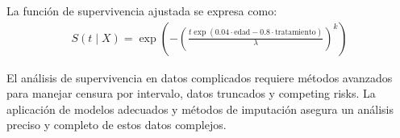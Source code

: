 \documentclass[a4paper]{report} %
\begin{document}
La funci\'on de supervivencia ajustada se expresa como:
\begin{eqnarray*}
S(t \mid X) = \exp\left(-\left(\frac{t \exp(0.04 \cdot \text{edad} - 0.8 \cdot \text{tratamiento})}{\lambda}\right)^k\right)
\end{eqnarray*}

El an\'alisis de supervivencia en datos complicados requiere m\'etodos avanzados para manejar censura por intervalo, datos truncados y competing risks. La aplicaci\'on de modelos adecuados y m\'etodos de imputaci\'on asegura un an\'alisis preciso y completo de estos datos complejos.
\end{document}
